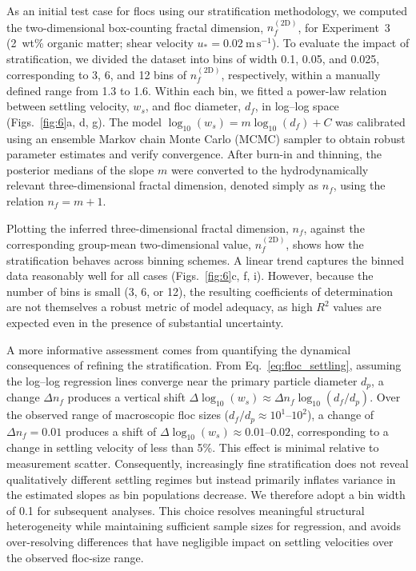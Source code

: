 \documentclass{agujournal2019}
\begin{document}
As an initial test case for flocs using our stratification methodology, we computed the two-dimensional box-counting fractal dimension, $n_f^{(2\mathrm{D})}$, for Experiment~3 (2~wt\% organic matter; shear velocity $u_* = 0.02~\mathrm{m\,s^{-1}}$). To evaluate the impact of stratification, we divided the dataset into bins of width 0.1, 0.05, and 0.025, corresponding to 3, 6, and 12 bins of $n_f^{(2\mathrm{D})}$, respectively, within a manually defined range from 1.3 to 1.6. Within each bin, we fitted a power-law relation between settling velocity, $w_s$, and floc diameter, $d_f$, in log--log space (Figs.~\ref{fig:6}a, d, g). The model $\log_{10}(w_s) = m \log_{10}(d_f) + C$ was calibrated using an ensemble Markov chain Monte Carlo (MCMC) sampler to obtain robust parameter estimates and verify convergence. After burn-in and thinning, the posterior medians of the slope $m$ were converted to the hydrodynamically relevant three-dimensional fractal dimension, denoted simply as $n_f$, using the relation $n_f = m + 1$.

Plotting the inferred three-dimensional fractal dimension, $n_f$, against the corresponding group-mean two-dimensional value, $n_f^{(2\mathrm{D})}$, shows how the stratification behaves across binning schemes. A linear trend captures the binned data reasonably well for all cases (Figs.~\ref{fig:6}c, f, i). However, because the number of bins is small (3, 6, or 12), the resulting coefficients of determination are not themselves a robust metric of model adequacy, as high $R^2$ values are expected even in the presence of substantial uncertainty.

A more informative assessment comes from quantifying the dynamical consequences of refining the stratification. From Eq.~\eqref{eq:floc_settling}, assuming the log--log regression lines converge near the primary particle diameter $d_p$, a change $\Delta n_f$ produces a vertical shift $\Delta \log_{10}(w_s) \approx \Delta n_f \log_{10}(d_f/d_p)$. Over the observed range of macroscopic floc sizes ($d_f/d_p \approx 10^1$--$10^2$), a change of $\Delta n_f = 0.01$ produces a shift of $\Delta \log_{10}(w_s) \approx 0.01$--$0.02$, corresponding to a change in settling velocity of less than 5\%. This effect is minimal relative to measurement scatter. Consequently, increasingly fine stratification does not reveal qualitatively different settling regimes but instead primarily inflates variance in the estimated slopes as bin populations decrease. We therefore adopt a bin width of 0.1 for subsequent analyses. This choice resolves meaningful structural heterogeneity while maintaining sufficient sample sizes for regression, and avoids over-resolving differences that have negligible impact on settling velocities over the observed floc-size range.
\end{document}
